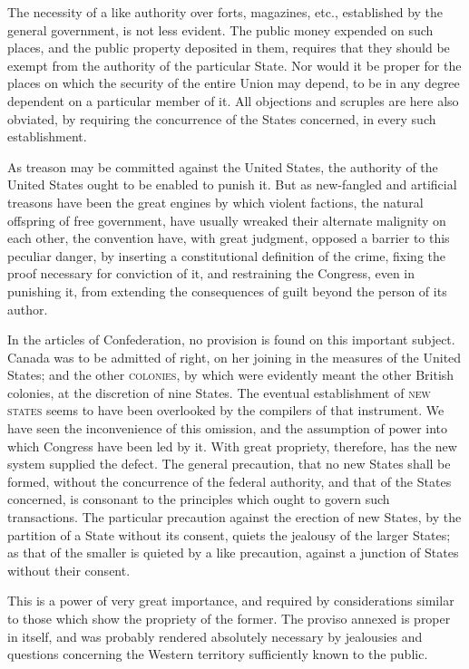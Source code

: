 The necessity of a like authority over forts, magazines, etc., established by the general government, is not less evident. The public money expended on such places, and the public property deposited in them, requires that they should be exempt from the authority of the particular State. Nor would it be proper for the places on which the security of the entire Union may depend, to be in any degree dependent on a particular member of it. All objections and scruples are here also obviated, by requiring the concurrence of the States concerned, in every such establishment.

As treason may be committed against the United States, the authority of the United States ought to be enabled to punish it. But as new-fangled and artificial treasons have been the great engines by which violent factions, the natural offspring of free government, have usually wreaked their alternate malignity on each other, the convention have, with great judgment, opposed a barrier to this peculiar danger, by inserting a constitutional definition of the crime, fixing the proof necessary for conviction of it, and restraining the Congress, even in punishing it, from extending the consequences of guilt beyond the person of its author.

In the articles of Confederation, no provision is found on this important subject. Canada was to be admitted of right, on her joining in the measures of the United States; and the other \textsc{colonies}, by which were evidently meant the other British colonies, at the discretion of nine States. The eventual establishment of \textsc{new states} seems to have been overlooked by the compilers of that instrument. We have seen the inconvenience of this omission, and the assumption of power into which Congress have been led by it. With great propriety, therefore, has the new system supplied the defect. The general precaution, that no new States shall be formed, without the concurrence of the federal authority, and that of the States concerned, is consonant to the principles which ought to govern such transactions. The particular precaution against the erection of new States, by the partition of a State without its consent, quiets the jealousy of the larger States; as that of the smaller is quieted by a like precaution, against a junction of States without their consent.

This is a power of very great importance, and required by considerations similar to those which show the propriety of the former. The proviso annexed is proper in itself, and was probably rendered absolutely necessary by jealousies and questions concerning the Western territory sufficiently known to the public.

